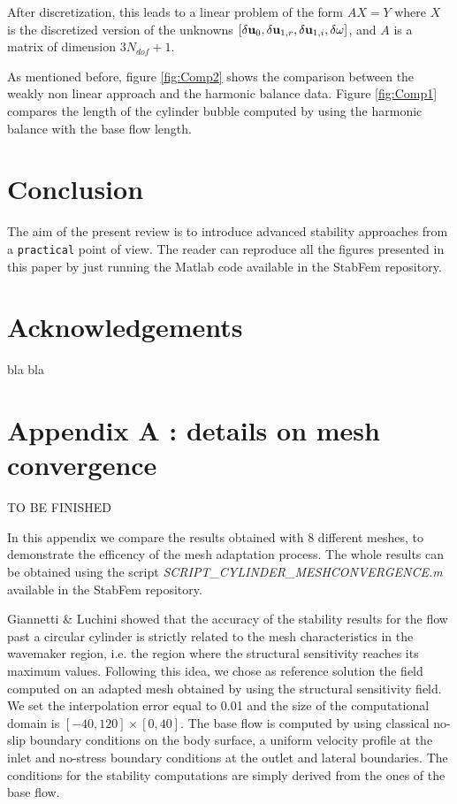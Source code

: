 \documentclass[twocolumn,10pt]{asme2ej}
\begin{document}
After discretization, this leads to a linear problem of the form $A X = Y$ where $X$ is the discretized version of the unknowns  $[\delta {\bf u }_0, \delta {\bf u }_{1,r}, \delta {\bf u }_{1,i}, \delta \omega]$, and $A$ is a matrix of dimension $3 N_{dof} +1$. 
 

As mentioned before, figure \ref{fig:Comp2} shows the comparison between the 
weakly non linear approach and the harmonic balance data.  
Figure \ref{fig:Comp1} compares the length of the cylinder bubble computed by using 
the harmonic balance with the base flow length. 




\section{Conclusion}
The aim of the present review is to introduce advanced stability approaches 
from a {\tt practical} point of view. The reader can reproduce all the figures presented 
in this paper by just running the Matlab code available in the StabFem repository. 


\section*{Acknowledgements}
bla bla

\section*{Appendix A : details on mesh convergence}


TO BE FINISHED

In this appendix we compare the results obtained with 8 different meshes, to demonstrate the efficency of the mesh adaptation process. The whole results can be obtained using the script {\em SCRIPT\_CYLINDER\_MESHCONVERGENCE.m} available in the StabFem repository.

Giannetti \& Luchini\cite{GiannettiLuchini} showed that the accuracy of the stability 
results for the flow past a circular cylinder is strictly related to the mesh characteristics 
in the wavemaker region, i.e. the region where the structural sensitivity reaches its 
maximum values. Following this idea, we chose as reference solution the field
computed on an adapted mesh obtained by using the structural sensitivity field.
We set the interpolation error equal to 0.01 and the size of the computational domain 
is $[-40,120]\times[0,40]$. The base flow is computed by using classical no-slip 
boundary conditions on the body surface, a uniform velocity profile at the inlet
and no-stress boundary conditions at the outlet and lateral boundaries.
The conditions for the stability computations are simply derived from the ones of the base flow.
\end{document}
